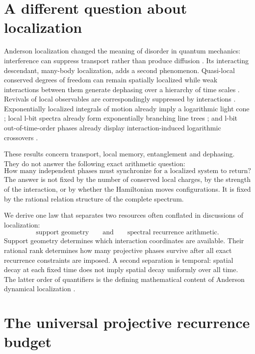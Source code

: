 \documentclass[10pt]{article}
\theoremstyle{definition}
\begin{document}
\section{A different question about localization}

Anderson localization changed the meaning of disorder in quantum mechanics:
interference can suppress transport rather than produce diffusion
\cite{Anderson1958}. Its interacting descendant, many-body localization,
adds a second phenomenon. Quasi-local conserved degrees of freedom can
remain spatially localized while weak interactions between them generate
dephasing over a hierarchy of time scales
\cite{SerbynPapicAbanin2013,HuseNandkishoreOganesyan2014}. Revivals of local
observables are correspondingly suppressed by interactions
\cite{VasseurParameswaranMoore2015}. Exponentially localized integrals of
motion already imply a logarithmic light cone
\cite{KimChandranAbanin2014}; local l-bit spectra already form exponentially
branching line trees \cite{NandkishoreGopalakrishnanHuse2014}; and l-bit
out-of-time-order phases already display interaction-induced logarithmic
crossovers \cite{ChenZhouHuseFradkin2017}.

These results concern transport, local memory, entanglement and dephasing.
They do not answer the following exact arithmetic question:
\begin{equation}
 \boxed{\text{How many independent phases must synchronize for a localized
 system to return?}}
 \label{eq:question}
\end{equation}
The answer is not fixed by the number of conserved local charges, by the
strength of the interaction, or by whether the Hamiltonian moves
configurations. It is fixed by the rational relation structure of the
complete spectrum.

We derive one law that separates two resources often conflated in
discussions of localization:
\[
 \text{support geometry}
 \qquad\text{and}\qquad
 \text{spectral recurrence arithmetic}.
\]
Support geometry determines which interaction coordinates are available.
Their rational rank determines how many projective phases survive after all
exact recurrence constraints are imposed. A second separation is temporal:
spatial decay at each fixed time does not imply spatial decay uniformly
over all time. The latter order of quantifiers is the defining mathematical
content of Anderson dynamical localization
\cite{HamzaSimsStolz2012}.

\section{The universal projective recurrence budget}
\end{document}
